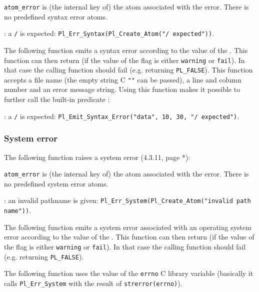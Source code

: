 \texttt{atom\_error} is (the internal key of) the atom associated with the
error. There is no predefined syntax error atoms.

: a \texttt{/} is expected:
\texttt{Pl\_Err\_Syntax(Pl\_Create\_Atom("/ expected"))}.

The following function emits a syntax error according to the value of the
  . This
function can then return (if the value of the flag is either
\texttt{warning} or \texttt{fail}). In that case the calling function should
fail (e.g. returning \texttt{PL\_FALSE}). This function accepts a file name (the
empty string C \texttt{""} can be passed), a line and column number and an
error message string. Using this function makes it possible to further call
the built-in predicate 
:


: a \texttt{/} is expected:
\texttt{Pl\_Emit\_Syntax\_Error("data", 10, 30, "/ expected")}.

\subsubsection{System error}
The following function raises a system error (4.3.11, page *):


\texttt{atom\_error} is (the internal key of) the atom associated with the
error. There is no predefined system error atoms.

: an invalid pathname is given:
\texttt{Pl\_Err\_System(Pl\_Create\_Atom("invalid path name"))}.

The following function emits a system error associated with an operating
system error according to the value of the   . This function can then return (if the
value of the flag is either \texttt{warning} or \texttt{fail}). In that case
the calling function should fail (e.g. returning \texttt{PL\_FALSE}).

The following function uses the value of the \texttt{errno} C library
variable (basically it calls \texttt{Pl\_Err\_System} with the result
of \texttt{strerror(errno)}).


